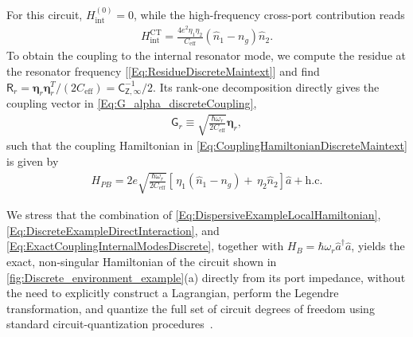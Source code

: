 \documentclass[prx,aps,twocolumn,article]{revtex4-2}
\newcommand{\msf}[1]{\mathsf{#1}}
\newcommand{\bsb}[1]{\boldsymbol{#1}}
\newcommand{\msZ}{\msf{Z}}
\newcommand{\msG}{\msf{G}}
\newcommand{\msC}{\msf{C}}
\newcommand{\msR}{\msf{R}}
\begin{document}
For this circuit, $H_{\mathrm{int}}^{(0)}=0$, while the high-frequency
cross-port contribution reads
\begin{align}
H_{\mathrm{int}}^{\mathrm{CT}}
=
\frac{4e^2\eta_1\eta_2}{C_{\mathrm{eff}}}
\left(
\hat n_1-n_g
\right)
\hat n_2.
\label{Eq:DiscreteExampleDirectInteraction}
\end{align}
To obtain the coupling to the internal resonator mode, we compute the residue at the resonator frequency
[\cref{Eq:ResidueDiscreteMaintext}] and find $\msR_r=\bsb{\eta}_r\bsb{\eta}_r^{T}/(2C_{\mathrm{eff}}) =\msC_{\msZ,\infty}^{-1}/2$. Its rank-one decomposition directly gives the coupling vector in
\cref{Eq:G_alpha_discreteCoupling},
\begin{align}
    \msG_r
    \equiv
    \sqrt{\frac{\hbar\omega_r}{2C_{\mathrm{eff}}}}
    \bsb{\eta}_r,
\end{align}
such that the coupling Hamiltonian in
\cref{Eq:CouplingHamiltonianDiscreteMaintext} is given by
\begin{align}
H_{PB}
=
2e\sqrt{\frac{\hbar\omega_r}{2C_{\mathrm{eff}}}}
\left[
\,\eta_1\left(\hat n_1-n_g\right)
+
\,\eta_2\hat n_2
\right]
\hat a
+
\mathrm{h.c.}
\label{Eq:ExactCouplingInternalModesDiscrete}
\end{align}

We stress that the combination of
\cref{Eq:DispersiveExampleLocalHamiltonian},
\cref{Eq:DiscreteExampleDirectInteraction}, and
\cref{Eq:ExactCouplingInternalModesDiscrete}, together with
$H_B=\hbar\omega_r\hat a^\dagger\hat a$, yields the exact,
non-singular Hamiltonian of the circuit shown in
\cref{fig:Discrete_environment_example}(a) directly from its port
impedance, without the need to explicitly construct a Lagrangian,
perform the Legendre transformation, and quantize the full set of
circuit degrees of freedom using standard circuit-quantization
procedures~\cite{Devoret:1997,Burkard:2004,ParraRodriguez:2024,Osborne:2024,ParraRodriguez:2025}.
\end{document}
